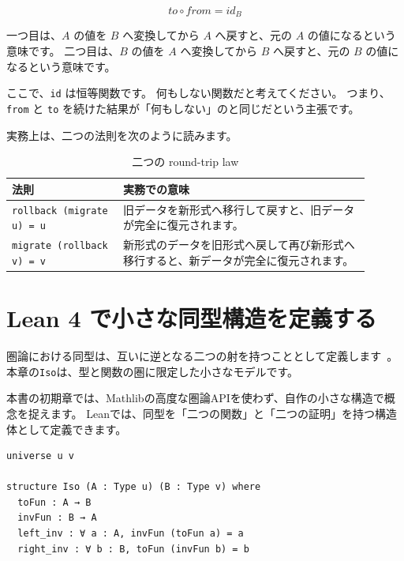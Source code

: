 \[
  \mathit{to} \circ \mathit{from} = \mathit{id}_B
\]

一つ目は、$A$ の値を $B$ へ変換してから $A$ へ戻すと、元の $A$ の値になるという意味です。
二つ目は、$B$ の値を $A$ へ変換してから $B$ へ戻すと、元の $B$ の値になるという意味です。

ここで、\texttt{id} は恒等関数です。
何もしない関数だと考えてください。
つまり、\texttt{from} と \texttt{to} を続けた結果が「何もしない」のと同じだという主張です。

実務上は、二つの法則を次のように読みます。

\begin{table}[htbp]
\centering
\begin{tabular}{p{0.28\linewidth}p{0.62\linewidth}}
\toprule
法則 & 実務での意味 \\
\midrule
\texttt{rollback (migrate u) = u} & 旧データを新形式へ移行して戻すと、旧データが完全に復元されます。 \\
\texttt{migrate (rollback v) = v} & 新形式のデータを旧形式へ戻して再び新形式へ移行すると、新データが完全に復元されます。 \\
\bottomrule
\end{tabular}
\caption{二つの round-trip law}
\label{tab:ch12-round-trip-laws}
\end{table}

\section{Lean 4 で小さな同型構造を定義する}

圏論における同型は、互いに逆となる二つの射を持つこととして定義します~\cite{leinster-basic-category-theory,riehl-category-theory-in-context}。
本章の\texttt{Iso}は、型と関数の圏に限定した小さなモデルです。
\label{sec:ch12-lean-iso}

本書の初期章では、Mathlibの高度な圏論APIを使わず、自作の小さな構造で概念を捉えます。
Leanでは、同型を「二つの関数」と「二つの証明」を持つ構造体として定義できます。

\begin{listing}[htbp]
\begin{verbatim}
universe u v

structure Iso (A : Type u) (B : Type v) where
  toFun : A → B
  invFun : B → A
  left_inv : ∀ a : A, invFun (toFun a) = a
  right_inv : ∀ b : B, toFun (invFun b) = b
\end{verbatim}
\caption{\texttt{Iso}}
\label{lst:ch12_iso_structure}
\end{listing}

